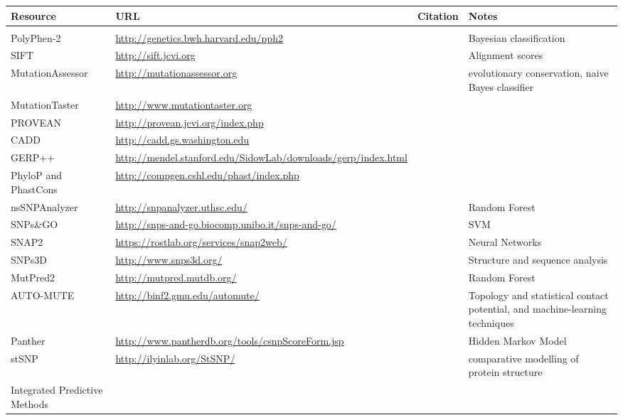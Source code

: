 \documentclass[10pt,letterpaper]{article}
\begin{document}
\begin{table}[p]
\centering
\begin{tabularx}{\textwidth}{p{3cm}Xp{1.7cm}X}
  \hline
Resource & URL & Citation & Notes \\
  \hline
 &  &  &  \\
  PolyPhen-2 & \url{http://genetics.bwh.harvard.edu/pph2} & \cite{Adzhubei2013-nj} & Bayesian classification \\
  SIFT & \url{http://sift.jcvi.org} & \cite{Ng2003-vp} & Alignment scores \\
  MutationAssessor & \url{http://mutationassessor.org} & \cite{Reva2011-en} & evolutionary conservation,  naive Bayes classifier \\
  MutationTaster & \url{http://www.mutationtaster.org} & \cite{Schwarz2014-ep} &   \\
  PROVEAN & \url{http://provean.jcvi.org/index.php} & \cite{Choi2012-tk} &   \\
  CADD & \url{http://cadd.gs.washington.edu} & \cite{Kircher2014-im} &   \\
  GERP++ & \url{http://mendel.stanford.edu/SidowLab/downloads/gerp/index.html} & \cite{Davydov2010-ui} &   \\
  PhyloP and PhastCons & \url{http://compgen.cshl.edu/phast/index.php} & \cite{Siepel2005-ke,Pollard2010-of} &   \\
  nsSNPAnalyzer & \url{http://snpanalyzer.uthsc.edu/} & \cite{Bao2005-jn} & Random Forest \\
  SNPs\&GO & \url{http://snps-and-go.biocomp.unibo.it/snps-and-go/} & \cite{Calabrese2009-mi} & SVM \\
  SNAP2 & \url{https://rostlab.org/services/snap2web/} & \cite{Hecht2015-ti} & Neural Networks \\
  SNPs3D & \url{http://www.snps3d.org/} & \cite{Yue2006-kj} & Structure and sequence analysis \\
  MutPred2 & \url{http://mutpred.mutdb.org/} & \cite{Pejaver2017-lr} & Random Forest \\
  AUTO-MUTE & \url{http://binf2.gmu.edu/automute/} & \cite{Masso2010-gf} & Topology  and statistical contact potential, and machine-learning techniques \\ 
  Panther & \url{http://www.pantherdb.org/tools/csnpScoreForm.jsp} & \cite{Thomas2003-rj} & Hidden Markov Model \\
  stSNP & \url{http://ilyinlab.org/StSNP/} & \cite{Uzun2007-bk} & comparative modelling of protein structure \\
  Integrated Predictive Methods &  &  &   \\

\end{tabularx}
\end{table}
\end{document}
